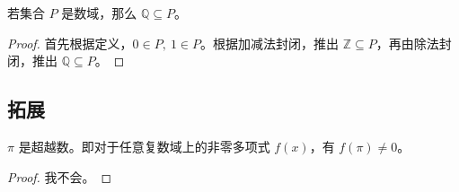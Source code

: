 \begin{property}
	若集合 $P$ 是数域，那么 $\mathbb{Q} \subseteq P$。

	\begin{proof}
		首先根据定义，$0 \in P,\ 1 \in P$。根据加减法封闭，推出 $\mathbb{Z} \subseteq P$，再由除法封闭，推出 $\mathbb{Q} \subseteq P$。
	\end{proof}
\end{property}

\subsection{拓展}

\begin{theorem}[林德曼定理]
	$\pi$ 是超越数。即对于任意复数域上的非零多项式 $f(x)$，有 $f(\pi) \neq 0$。

	\begin{proof}
		我不会。
	\end{proof}
\end{theorem}